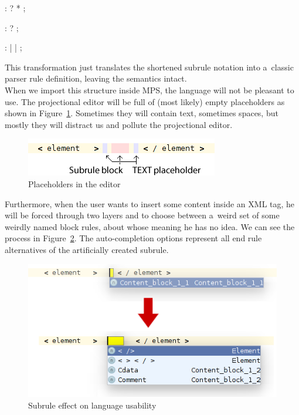 \begin{antlr}
	          :   ? * ;

	 :    ?
	                 ;

	 :   
	                 |   
	                 |   
	                 ;
\end{antlr}

This transformation just translates the shortened subrule notation into a~classic parser rule definition, leaving the semantics intact.
\\

When we import this structure inside MPS, the language will not be pleasant to use.
The projectional editor will be full of (most likely) empty  placeholders as shown in Figure~\ref{fig:text_placeholders}.
Sometimes they will contain text, sometimes spaces, but mostly they will distract us and pollute the projectional editor.

\begin{figure}[h]
	\centering
	\includegraphics[scale=0.75]{./img/text_placeholders.png}
	\caption{Placeholders in the editor}
	\label{fig:text_placeholders}
\end{figure}

Furthermore, when the user wants to insert some content inside an XML tag, he will be forced through two layers and to choose between a~weird set of some weirdly named block rules, about whose meaning he has no idea.
We can see the process in Figure~\ref{fig:subrule_problem}.
The auto-completion options represent all end rule alternatives of the artificially created  subrule.
\\

\begin{figure}[h]
	\centering
	\includegraphics[scale=0.75]{./img/subrule_problem.png}
	\caption{Subrule effect on language usability}
	\label{fig:subrule_problem}
\end{figure}

